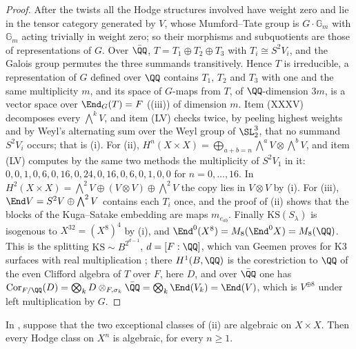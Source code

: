 \begin{proof}
After the twists all the Hodge structures involved have weight zero and lie in
the tensor category generated by $V$, whose Mumford--Tate group is
$G\cdot\mathbb{G}_{m}$ with $\mathbb{G}_{m}$ acting trivially in weight zero;
so their morphisms and subquotients are those of representations of $G$.
Over $\bar{\QQ}$, $T=T_{1}\oplus T_{2}\oplus T_{3}$ with $T_{i}\cong S^{2}V_{i}$,
and the Galois group permutes the three summands transitively. Hence $T$ is
irreducible, a representation of $G$ defined over $\QQ$ contains
$T_{1}$, $T_{2}$ and $T_{3}$ with one and the same multiplicity $m$, and its
space of $G$-maps from $T$, of $\QQ$-dimension $3m$, is a vector space over
$\End_{G}(T)=F$ ((iii)) of dimension $m$. Item (XXXV)
decomposes every $\bigwedge^{k}V$, and item (LV) checks twice, by peeling
highest weights and by Weyl's alternating sum over the Weyl group of
$\SL_{2}^{3}$, that no summand $S^{2}V_{i}$ occurs; that is (i). For (ii),
$H^{n}(X\times X)=\bigoplus_{a+b=n}\bigwedge^{a}V\otimes\bigwedge^{b}V$, and
item (LV) computes by the same two methods the multiplicity of $S^{2}V_{1}$
in it: $0,0,1,0,6,0,16,0,24,0,16,0,6,0,1,0,0$ for $n=0,\dots,16$. In
$H^{2}(X\times X)=\bigwedge^{2}V\oplus(V\otimes V)\oplus\bigwedge^{2}V$ the
copy lies in $V\otimes V$ by (i). For (iii), $\End V=S^{2}V\oplus
\bigwedge^{2}V$ contains each $T_{i}$ once, and the proof of
(ii) shows that the blocks of the Kuga--Satake embedding
are maps $m_{e_{ab}}$. Finally $\mathrm{KS}(S_{\lambda})$ is isogenous to
$X^{32}=(X^{8})^{4}$ by (i), and
$\End^{0}(X^{8})=M_{8}(\End^{0}X)=M_{8}(\QQ)$. This is the splitting
$\mathrm{KS}\sim B^{2^{d-1}}$, $d=[F:\QQ]$, which van Geemen proves for K3
surfaces with real multiplication \cite{vG08}; there $H^{1}(B,\QQ)$ is the
corestriction to $\QQ$ of the even Clifford algebra of $T$ over $F$, here
$D$, and over $\bar{\QQ}$ one has $\operatorname{Cor}_{F/\QQ}(D)=
\bigotimes_{k}D\otimes_{F,\sigma_{k}}\bar{\QQ}=\bigotimes_{k}\End(V_{k})=
\End(V)$, which is $V^{\oplus8}$ under left multiplication by $G$.
\end{proof}

\begin{theorem}\label{thm:mumfordpowers}
In , suppose that the two exceptional classes of
(ii) are algebraic on $X\times X$. Then every Hodge
class on $X^{n}$ is algebraic, for every $n\ge1$.
\end{theorem}

